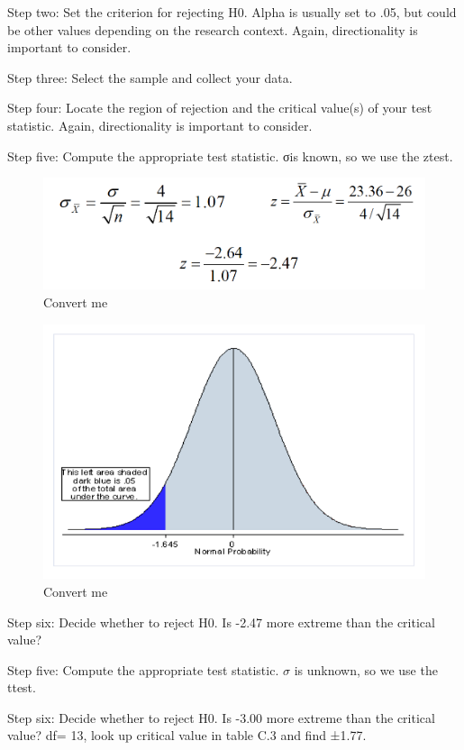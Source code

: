 \documentclass[]{book}
\theoremstyle{definition}
\theoremstyle{definition}
\theoremstyle{definition}
\theoremstyle{remark}
\begin{document}
Step two: Set the criterion for rejecting H0. Alpha is usually set to
.05, but could be other values depending on the research context. Again,
directionality is important to consider.

Step three: Select the sample and collect your data.

Step four: Locate the region of rejection and the critical value(s) of
your test statistic. Again, directionality is important to consider.

Step five: Compute the appropriate test statistic. σis known, so we use
the ztest.

\begin{figure}
\centering
\includegraphics{img/hickssampling6.png}
\caption{Convert me}
\end{figure}

\begin{figure}
\centering
\includegraphics{img/hickssampling7.png}
\caption{Convert me}
\end{figure}

Step six: Decide whether to reject H0. Is -2.47 more extreme than the
critical value?

Step five: Compute the appropriate test statistic. \(\sigma\) is
unknown, so we use the ttest.

Step six: Decide whether to reject H0. Is -3.00 more extreme than the
critical value? df= 13, look up critical value in table C.3 and find
±1.77.
\end{document}
